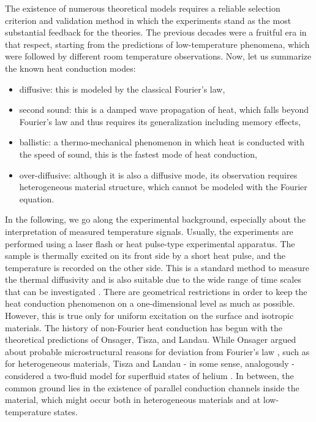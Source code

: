 \documentclass[sn-mathphys]{sn-jnl}%
\theoremstyle{thmstyleone}%
\theoremstyle{thmstyletwo}%
\theoremstyle{thmstylethree}%
\begin{document}
{{The existence of numerous theoretical models requires a reliable selection criterion and validation method in which the experiments stand as the most substantial feedback for the theories. The previous decades were a fruitful era in that respect, starting from the predictions of low-temperature phenomena, which were followed by different room temperature observations.} Now, let us summarize the known heat conduction modes:
\begin{itemize}
\item diffusive: this is modeled by the classical Fourier's law,
\item second sound: this is a damped wave propagation of heat, which falls beyond Fourier's law and thus requires its generalization including memory effects,
\item ballistic: a thermo-mechanical phenomenon in which heat is conducted with the speed of sound, this is the fastest mode of heat conduction,
\item over-diffusive: although it is also a diffusive mode, its observation requires heterogeneous material structure, which cannot be modeled with the Fourier equation.
\end{itemize}

{In the following, we go along the experimental background, especially about the interpretation of measured temperature signals. Usually, the experiments are performed using a laser flash or heat pulse-type experimental apparatus. The sample is thermally excited on its front side by a short heat pulse, and the temperature is recorded on the other side.} This is a standard method to measure the thermal diffusivity and is also suitable due to the wide range of time scales that can be investigated \cite{ParEtal61}. There are geometrical restrictions in order to keep the heat conduction phenomenon on a one-dimensional level as much as possible. However, this is true only for uniform excitation on the surface and isotropic materials. The history of non-Fourier heat conduction has begun with the theoretical predictions of Onsager, Tisza, and Landau. While Onsager argued about probable microstructural reasons for deviation from Fourier's law \cite{Onsager31I}, such as for heterogeneous materials, Tisza and Landau - in some sense, analogously - considered a two-fluid model for superfluid states of helium \cite{Tisza38, Lan41}. In between, the common ground lies in the existence of parallel conduction channels inside the material, which might occur both in heterogeneous materials and at low-temperature states.

}
\end{document}
